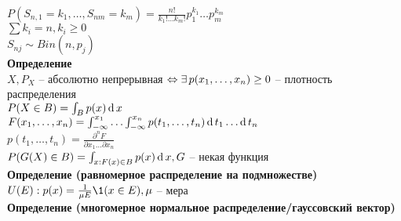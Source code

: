 \documentclass[12pt]{article}
\begin{document}
$P(S_{n,1}=k_1,\ldots, S_{nm}=k_m) = \frac{n!}{k_1!\ldots k_m!}p_1^{k_1}\ldots p_m^{k_m}$\\
$\sum k_i = n, k_i \geq 0$\\
$S_{nj} \sim Bin(n, p_j)$\\
\textbf{Определение}\\
$X, P_X$ -- абсолютно непрерывная $\Leftrightarrow \exists\, p(x_1, \ldots, x_n) \geq 0$ -- плотность распределения\\
$P(X \in B) = \int_B p(x)\operatorname{d} x$\\
$F(x_1, \ldots, x_n) = \int_{-\infty}^{x_1}\ldots \int_{-\infty}^{x_n} p(t_1, \ldots, t_n) \operatorname{d} t_1\ldots \operatorname{d} t_n$\\
$p(t_1, \ldots, t_n) = \frac{\partial^n F}{\partial x_1 \ldots \partial x_n}$\\
$P(G(X) \in B) = \int_{x:F(x)\in B} p(x)\operatorname{d} x, G$ -- некая функция\\
\textbf{Определение (равномерное распределение на подмножестве)}\\
$U(E): p(x) = \frac{1}{\mu E}\1(x\in E), \mu$ -- мера\\
\textbf{Определение (многомерное нормальное распределение/гауссовский вектор)}
\end{document}
